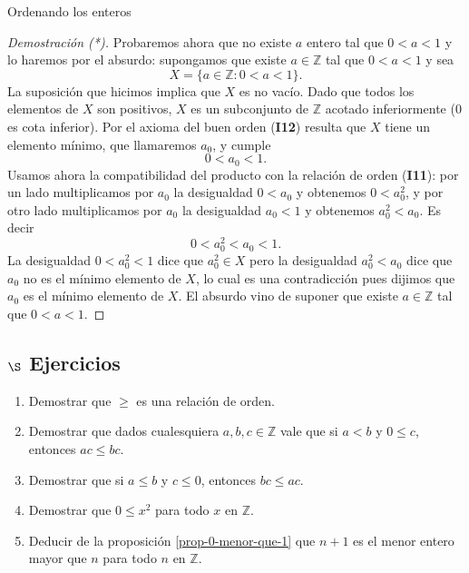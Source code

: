 \begin{section}{Ordenando los enteros}
\begin{proof}[Demostración (*)]
	 
	
	
Probaremos ahora que no existe $a$ entero tal que $ 0<a<1$ y lo haremos por el absurdo: supongamos que existe $a \in \mathbb Z$ tal que $0<a<1$ y sea 
$$
X=\{a\in\mathbb Z: 0<a<1\}.
$$
La  suposición que hicimos implica que $X$ es no vacío. 
Dado que todos los elementos de $X$ son positivos, $X$ es un subconjunto de $\mathbb Z$ acotado inferiormente ($0$ es cota inferior).
Por el axioma del buen orden (\textbf{I12}) resulta que $X$ tiene un elemento mínimo, que llamaremos $a_0$, y cumple
$$
0<a_0<1. 
$$
Usamos ahora la compatibilidad del  producto con 
la relación de orden (\textbf{I11}): 
por un lado multiplicamos por $a_0$ la desigualdad $0<a_0$ y obtenemos $0<a_0^2$, 
y por otro lado multiplicamos por $a_0$ la desigualdad $a_0<1$ y obtenemos $a_0^2<a_0$. Es decir
$$
 0<a_0^2<a_0<1.
$$
La desigualdad $0<a_0^2<1$ dice que $a_0^2\in X$ pero la desigualdad $a_0^2<a_0$ dice que 
$a_0$ no es el mínimo elemento de $X$, lo cual es una contradicción pues dijimos que $a_0$ es el mínimo elemento de $X$. 
El  absurdo  vino de suponer que existe $a \in \mathbb Z$ tal que   $0<a<1$.
\end{proof}


\subsection*{\Large $\S$ Ejercicios}



\begin{enumerate}
		\item Demostrar que $\ge$ es una relación de orden.
		
		\item Demostrar que dados cualesquiera $a,b,c \in \mathbb Z$ vale que si $a< b$ y $0\le c$, entonces $ac \le bc$. 
		
		\item Demostrar que si $a\le b$ y $c\le 0$, entonces $bc \le ac$.
		
		\item Demostrar que $0\le x^2$ para todo $x$ en $\mathbb Z$.
		
		\item Deducir de la proposición \ref{prop-0-menor-que-1} que $n+1$ es el menor entero mayor que $n$ para todo $n$ en $\mathbb Z$.


\end{enumerate}
\end{section}
